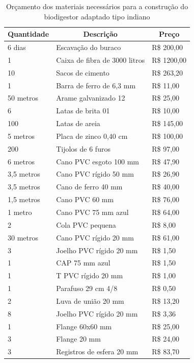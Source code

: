 \begin{table}[!h]
\centering
\caption{Orçamento dos materiais necessários para a construção do biodigestor adaptado tipo indiano}
\begin{tabular}{|l|l|l|}
\multicolumn{1}{c}{\textbf{Quantidade}} & \multicolumn{1}{c}{\textbf{Descrição}} & \multicolumn{1}{c}{\textbf{Preço}} \\ \hline
6 dias & Escavação do buraco & R\$ 200,00\\ \hline
1 & Caixa de fibra de 3000 litros & R\$ 1200,00 \\ \hline
10 & Sacos de cimento & R\$ 263,20 \\ \hline
1 & Barra de ferro de 6,3 mm & R\$ 11,00 \\ \hline
50 metros & Arame galvanizado 12 & R\$ 25,00 \\ \hline
6 & Latas de brita 01 & R\$ 10,00 \\ \hline
100 & Latas de areia & R\$ 145,00 \\ \hline
5 metros & Placa de zinco 0,40 cm & R\$ 100,00 \\ \hline
200 & Tijolos de 6 furos & R\$ 97,00 \\ \hline
6 metros & Cano PVC esgoto 100 mm & R\$ 47,90 \\ \hline
3,5 metros & Cano PVC rígido 50 mm & R\$ 26,90 \\ \hline
3,5 metros & Cano de ferro 40 mm & R\$ 40,00 \\ \hline
1,5 metros & Cano PVC 60 mm & R\$ 76,00 \\ \hline
1 metro & Cano PVC 75 mm azul & R\$ 64,00 \\ \hline
2 & Cola PVC pequena & R\$ 8,00 \\ \hline
30 metros & Cano PVC rígido 20 mm & R\$ 61,00 \\ \hline
3 & Joelho PVC rígido 20 mm & R\$ 1,50 \\ \hline
1 & CAP 75 mm azul & R\$ 1,50 \\ \hline
1 & T PVC rígido 20 mm & R\$ 1,00 \\ \hline
1 & Parafuso 29 cm 4/8 & R\$ 0,50 \\ \hline
2 & Luva de união 20 mm & R\$ 13,20 \\ \hline
8 & Joelho PVC rígido 20 mm & R\$ 3,36 \\ \hline
1 & Flange 60x60 mm & R\$ 25,00 \\ \hline
3 & Flange 20 mm & R\$ 24,00 \\ \hline
3 & Registros de esfera 20 mm & R\$ 83,70 \\ \hline

\end{tabular}
\end{table}
